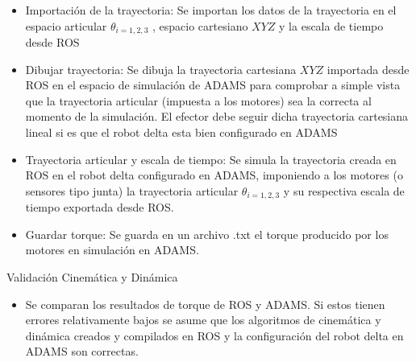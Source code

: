         \begin{itemize}
            \item {Importación de la trayectoria: Se importan los datos de la trayectoria en el espacio articular $\theta_{i=1,2,3}$ , espacio cartesiano $XYZ$ y la escala de tiempo desde ROS}
            \item {Dibujar trayectoria: Se dibuja la trayectoria cartesiana $XYZ$ importada desde ROS en el espacio de simulación de ADAMS para comprobar a simple vista que la trayectoria articular (impuesta a los motores) sea la correcta al momento de la simulación. El efector debe seguir dicha trayectoria cartesiana lineal si es que el robot delta esta bien configurado en ADAMS}
            \item {Trayectoria articular y escala de tiempo: Se simula la trayectoria creada en ROS en el robot delta configurado en ADAMS, imponiendo a los motores (o sensores tipo junta) la trayectoria articular $\theta_{i=1,2,3}$ y su respectiva escala de tiempo exportada desde ROS.}
            \item {Guardar torque: Se guarda en un archivo .txt el torque producido por los motores en simulación en ADAMS.  }
        \end{itemize}
        \item Validación Cinemática y Dinámica
        \begin{itemize}
            \item {Se comparan los resultados de torque de ROS y ADAMS. Si estos tienen errores relativamente bajos se asume que los algoritmos de cinemática y dinámica creados y compilados en ROS y la configuración del robot delta en ADAMS son correctas.}
        \end{itemize}  

        \newpage
        
        
